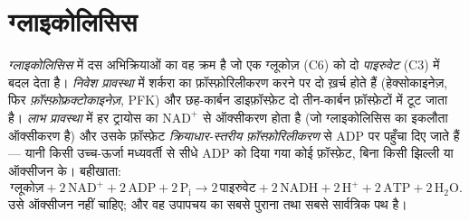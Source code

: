\section{ग्लाइकोलिसिस}

\begin{definition}[ग्लाइकोलिसिस]\label{def:b1:respiration-fermentation:glycolysis}
\emph{ग्लाइकोलिसिस}  में दस  अभिक्रियाओं का वह क्रम है
जो एक ग्लूकोज़ (C6) को दो \emph{पाइरुवेट} (C3) में बदल देता है।
\emph{निवेश प्रावस्था} में शर्करा का फ़ॉस्फ़ोरिलीकरण करने पर दो 
ख़र्च होते हैं (हेक्सोकाइनेज़, फिर \emph{फ़ॉस्फ़ोफ्रक्टोकाइनेज़}, PFK)
और छह-कार्बन डाइफ़ॉस्फ़ेट दो तीन-कार्बन फ़ॉस्फ़ेटों में टूट जाता है।
\emph{लाभ प्रावस्था} में हर ट्रायोस का $\mathrm{NAD^+}$ से ऑक्सीकरण होता
है (जो ग्लाइकोलिसिस का इकलौता ऑक्सीकरण है) और उसके फ़ॉस्फ़ेट
\emph{क्रियाधार-स्तरीय फ़ॉस्फ़ोरिलीकरण} से ADP पर पहुँचा दिए जाते हैं --- यानी किसी उच्च-ऊर्जा
मध्यवर्ती से सीधे ADP को दिया गया कोई फ़ॉस्फ़ेट, बिना किसी झिल्ली या
ऑक्सीजन के। बहीखाता:
\[
\text{ग्लूकोज़} + 2\,\mathrm{NAD^+} + 2\,\mathrm{ADP} + 2\,\mathrm{P_i}
\to 2\,\text{पाइरुवेट} + 2\,\mathrm{NADH} + 2\,\mathrm{H^+} + 2\,\mathrm{ATP} + 2\,\mathrm{H_2O} .
\]
उसे ऑक्सीजन नहीं चाहिए; और वह उपापचय का सबसे पुराना तथा सबसे सार्वत्रिक
पथ है।
\end{definition}

